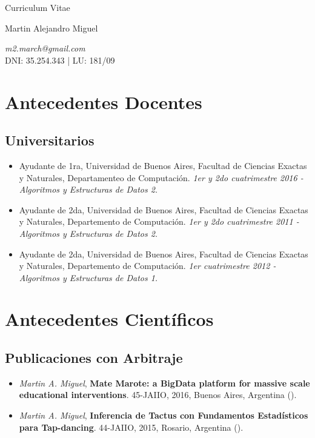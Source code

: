 \documentclass[a4paper,10pt]{article}
\begin{document}
\begin{center}
    { \Huge
    Curriculum Vitae}
\bigskip

{\Large Martin Alejandro Miguel} \\
\medskip

\emph{m2.march@gmail.com} \\
DNI: 35.254.343 | LU: 181/09 
\end{center}


\section{Antecedentes Docentes}

\subsection{Universitarios}

\begin{itemize}
    \item Ayudante de 1ra, Universidad de Buenos Aires, Facultad de Ciencias
        Exactas y Naturales, Departamenteo de Computación. \emph{1er y 2do
        cuatrimestre 2016 - Algoritmos y Estructuras de Datos 2.}
    \item Ayudante de 2da, Universidad de Buenos Aires, Facultad de Ciencias
Exactas y Naturales, Departemento de Computación. \emph{1er y 2do cuatrimestre
2011 - 
Algoritmos y Estructuras de Datos 2.}
    \item Ayudante de 2da, Universidad de Buenos Aires, Facultad de Ciencias
Exactas y Naturales, Departemento de Computación. \emph{1er cuatrimestre 2012 -
Algoritmos y Estructuras de Datos 1.}
\end{itemize}

\section{Antecedentes Científicos}

\subsection{Publicaciones con Arbitraje}

\begin{itemize}
    \item 
\emph{Martin A. Miguel}, 
\textbf{Mate Marote: a BigData platform for massive scale educational
        interventions}.
        45-JAIIO, 2016, Buenos Aires, Argentina ().
    \item 
\emph{Martin A. Miguel}, 
\textbf{Inferencia de Tactus con Fundamentos Estadísticos para Tap-dancing}.
        44-JAIIO, 2015, Rosario, Argentina ().
\end{itemize}
\end{document}
